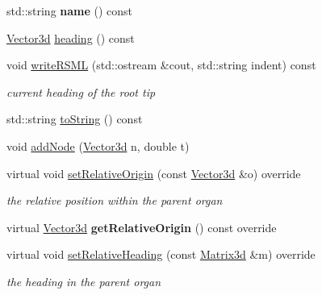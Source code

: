 \begin{DoxyCompactItemize}
\mbox{\label{classCPlantBox_1_1Leaf_ae68f299d352c727ff048406ac4d20533}} 
std\+::string {\bfseries name} () const
\item 
\hyperlink{classCPlantBox_1_1Vector3d}{Vector3d} \hyperlink{classCPlantBox_1_1Leaf_a89394580667c92220d87eae287faf5a9}{heading} () const
\item 
void \hyperlink{classCPlantBox_1_1Leaf_a0b5fbb524de825790da55551a212d4a0}{write\+R\+S\+ML} (std\+::ostream \&cout, std\+::string indent) const
\begin{DoxyCompactList}\small\item\em current heading of the root tip \end{DoxyCompactList}\item 
std\+::string \hyperlink{classCPlantBox_1_1Leaf_a7c09270825fa8f874dcf409969dbb554}{to\+String} () const
\item 
void \hyperlink{classCPlantBox_1_1Leaf_a9f4d6290903936f87fb016d8e0bbe344}{add\+Node} (\hyperlink{classCPlantBox_1_1Vector3d}{Vector3d} n, double t)
\item 
\mbox{\label{classCPlantBox_1_1Leaf_a755a8ce67ead658bc329de33c404ed82}} 
virtual void \hyperlink{classCPlantBox_1_1Leaf_a755a8ce67ead658bc329de33c404ed82}{set\+Relative\+Origin} (const \hyperlink{classCPlantBox_1_1Vector3d}{Vector3d} \&o) override
\begin{DoxyCompactList}\small\item\em the relative position within the parent organ \end{DoxyCompactList}\item 
\mbox{\label{classCPlantBox_1_1Leaf_abfe0297a2b109a82f21224aeae1e50e0}} 
virtual \hyperlink{classCPlantBox_1_1Vector3d}{Vector3d} {\bfseries get\+Relative\+Origin} () const override
\item 
\mbox{\label{classCPlantBox_1_1Leaf_afb6a3c04e1197a510617574bc72e8a47}} 
virtual void \hyperlink{classCPlantBox_1_1Leaf_afb6a3c04e1197a510617574bc72e8a47}{set\+Relative\+Heading} (const \hyperlink{classCPlantBox_1_1Matrix3d}{Matrix3d} \&m) override
\begin{DoxyCompactList}\small\item\em the heading in the parent organ \end{DoxyCompactList}\item 

\end{DoxyCompactItemize}
